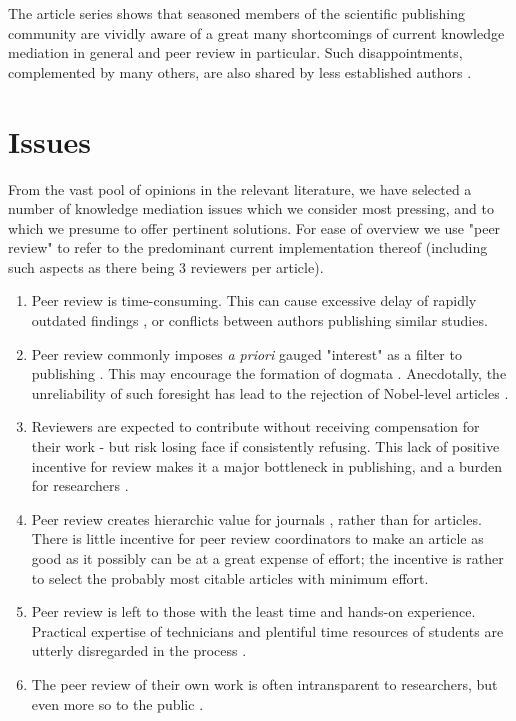 The article series shows that seasoned members of the scientific publishing community are vividly aware of a great many shortcomings of current knowledge mediation in general and peer review in particular.
Such disappointments, complemented by many others, are also shared by less established authors \cite{Mainguy2005}.

\section{Issues}
From the vast pool of opinions in the relevant literature, we have selected a number of knowledge mediation issues which we consider most pressing, and to which we presume to offer pertinent solutions. For ease of overview we use "peer review" to refer to the predominant current implementation thereof (including such aspects as there being 3 reviewers per article).
\begin{enumerate}
	\item Peer review is time-consuming.
	This can cause excessive delay of rapidly outdated findings \cite{Riley2006}, or conflicts between authors publishing similar studies.
	\item Peer review commonly imposes \textit{a priori} gauged "interest" as a filter to publishing \cite{Bloom2006}. 
	This may encourage the formation of dogmata \cite{Akerman2006}. 
	Anecdotally, the unreliability of such foresight has lead to the rejection of Nobel-level articles \cite{Nature2003}.
	\item Reviewers are expected to contribute without receiving compensation for their work - but risk losing face if consistently refusing.
	This lack of positive incentive for review makes it a major bottleneck in publishing, and a burden for researchers \cite{Koop2006}.
	\item Peer review creates hierarchic value for journals \cite{Jennings2006,Wager2006}, rather than for articles. 
	There is little incentive for peer review coordinators to make an article as good as it possibly can be at a great expense of effort;
	the incentive is rather to select the probably most citable articles with minimum effort.
	\item Peer review is left to those with the least time and hands-on experience.
	Practical expertise of technicians and plentiful time resources of students are utterly disregarded in the process \cite{Lahiri2006}.
	\item The peer review of their own work is often intransparent to researchers, but even more so to the public \cite{Brown2006}.
\end{enumerate}
